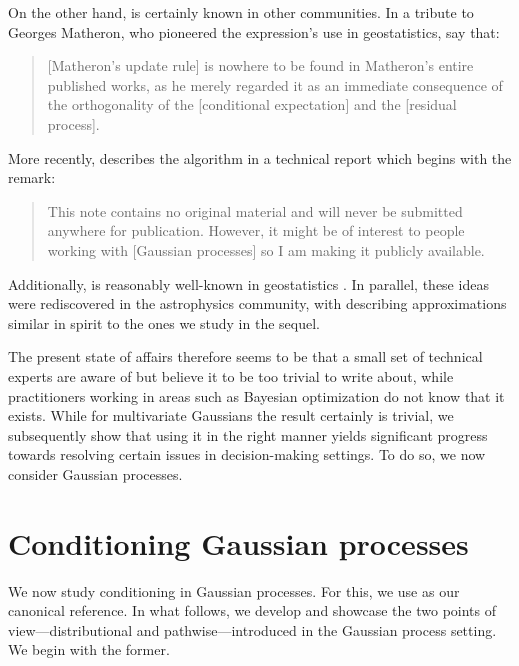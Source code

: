 \documentclass[11pt]{book}
\begin{document}
On the other hand,  is certainly known in other communities.
In a tribute to Georges Matheron, who pioneered the expression's use in geostatistics, \textcite{chiles05} say that:

\begin{quotation}
[Matheron's update rule] is nowhere to be found in Matheron's entire published works, as he merely regarded it as an immediate consequence of the orthogonality of the [conditional expectation] and the [residual process].
\end{quotation}

More recently, \textcite{doucet10} describes the algorithm in a technical report which begins with the remark: 

\begin{quotation}
This note contains no original material and will never be submitted anywhere for publication. However, it might be of interest to people working with [Gaussian processes] so I am making it publicly available.
\end{quotation}

Additionally,  is reasonably well-known in geostatistics \cite{journel78,defouquet94,emery07,oliver96}.
In parallel, these ideas were rediscovered in the astrophysics community, with \textcite{hoffman91} describing approximations similar in spirit to the ones we study in the sequel.

The present state of affairs therefore seems to be that a small set of technical experts are aware of  but believe it to be too trivial to write about, while practitioners working in areas such as Bayesian optimization do not know that it exists.
While for multivariate Gaussians the result certainly is trivial, we subsequently show that using it in the right manner yields significant progress towards resolving certain issues in decision-making settings.
To do so, we now consider Gaussian processes.

\section{Conditioning Gaussian processes}

We now study conditioning in Gaussian processes.
For this, we use \textcite{rasmussen06} as our canonical reference.
In what follows, we develop and showcase the two points of view---distributional and pathwise---introduced in the Gaussian process setting.
We begin with the former.
\end{document}
